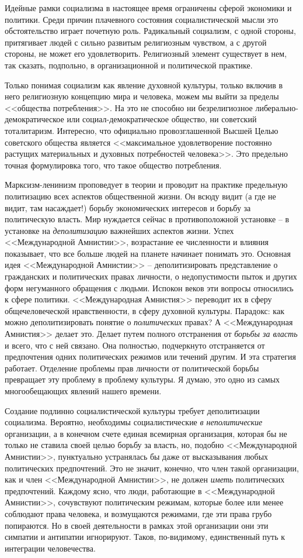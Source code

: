 \documentclass{book}
\begin{document}
Идейные рамки социализма в настоящее время ограничены сферой экономики и политики. Среди причин плачевного состояния социалистической мысли это обстоятельство играет почетную роль. Радикальный социализм, с одной стороны, притягивает людей с сильно развитым религиозным чувством, а с другой стороны, не может его удовлетворить. Религиозный элемент существует в нем, так сказать, подпольно, в организационной и политической практике.

Только понимая социализм как явление духовной культуры, только включив в него религиозную концепцию мира и человека, можем мы выйти за пределы <<общества потребления>>. На это не способно ни безрелигиозное либерально-демократическое или социал-демократическое общество, ни советский тоталитаризм. Интересно, что официально провозглашенной Высшей Целью советского общества является <<максимальное удовлетворение постоянно растущих материальных и духовных потребностей человека>>. Это предельно точная формулировка того, что такое общество потребления.

Марксизм-ленинизм проповедует в теории и проводит на практике предельную политизацию всех аспектов обществен­ной жизни. Он всюду видит (а где не видит, там насаждает!) борьбу экономических интересов и борьбу за политическую власть. Мир нуждается сейчас в противоположной установке -- в установке на \textit{деполитизацию}  важнейших аспектов жизни. Успех <<Международной Амнистии>>, возрастание ее численно­сти и влияния показывает, что все больше людей на планете начи­нает понимать это. Основная идея <<Международной Амнистии>> -- деполитизировать представление о гражданских и поли­тических правах личности, о недопустимости пыток и других форм негуманного обращения с людьми. Испокон веков эти вопросы относились к сфере политики. <<Международная Амни­стия>> переводит их в сферу общечеловеческой нравственности, в сферу духовной культуры. Парадокс: как можно деполитизи­ровать понятие о \textit{политических}  правах? А <<Международная Амнистия>> делает это. Делает путем полного отстранения от \textit{борьбы за власть}  и всего, что с ней связано. Она полностью, подчеркнуто отстраняется от предпочтения одних политиче­ских режимов или течений другим. И эта стратегия работает. Отделение проблемы прав личности от политической борьбы превращает эту проблему в проблему культуры. Я думаю, это одно из самых многообещающих явлений нашего времени.

Создание подлинно социалистической культуры требует деполитизации социализма. Вероятно, необходимы социалисти­ческие \textit{в неполитические}  организации, а в конечном счете еди­ная всемирная организация, которая бы не только не ставила своей целью борьбу за власть, но, подобно <<Международной Амнистии>>, пунктуально устранялась бы даже от высказывания любых политических предпочтений. Это не значит, конеч­но, что член такой организации, как и член <<Международной Амнистии>>, не должен \textit{иметь}  политических предпочтений. Каж­дому ясно, что люди, работающие в <<Международной Амни­стии>>, сочувствуют политическим режимам, которые более или менее соблюдают права человека, и возмущаются режимами, где эти права грубо попираются. Но в своей деятельности в рам­ках этой организации они эти симпатии и антипатии игнорируют. Таков, по-видимому, единственный путь к интеграции челове­чества.
\end{document}
